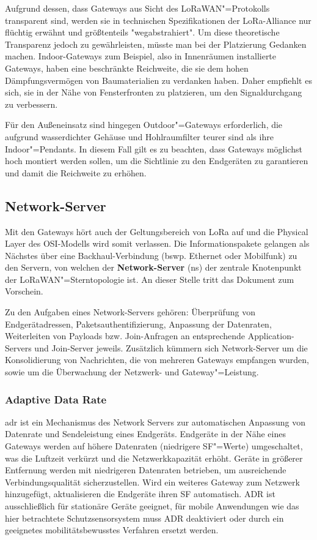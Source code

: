 Aufgrund dessen, dass Gateways aus Sicht des LoRaWAN"=Protokolls transparent sind, werden sie in technischen Spezifikationen der 
LoRa-Alliance nur flüchtig erwähnt und größtenteils "wegabstrahiert". Um diese theoretische Transparenz jedoch zu gewährleisten, 
müsste man bei der Platzierung Gedanken machen. Indoor-Gateways zum Beispiel, also in Innenräumen installierte Gateways, 
haben eine beschränkte Reichweite, die sie dem hohen Dämpfungsvermögen von Baumaterialien zu verdanken haben. 
Daher empfiehlt es sich, sie in der Nähe von Fensterfronten zu platzieren, um den Signaldurchgang zu verbessern. 

Für den Außeneinsatz sind hingegen Outdoor"=Gateways erforderlich, die aufgrund wasserdichter Gehäuse und Hohlraumfilter 
teurer sind als ihre Indoor"=Pendants. In diesem Fall gilt es zu beachten, dass Gateways möglichst hoch montiert werden sollen, 
um die Sichtlinie zu den Endgeräten zu garantieren und damit die Reichweite zu erhöhen.

\subsection{Network-Server}

Mit den Gateways hört auch der Geltungsbereich von LoRa auf und die Physical Layer des OSI-Modells wird somit verlassen. 
Die Informationspakete gelangen als Nächstes über eine Backhaul-Verbindung (bswp. Ethernet oder Mobilfunk) zu den Servern, 
von welchen der \textbf{Network-Server} (\acrshort{ns}) der zentrale Knotenpunkt der LoRaWAN"=Sterntopologie ist. 
An dieser Stelle tritt das Dokument  zum Vorschein. 

Zu den Aufgaben eines Network-Servers gehören: Überprüfung von Endgerätadressen, Paketsauthentifizierung, Anpassung der Datenraten, Weiterleiten von Payloads bzw. Join-Anfragen an entsprechende 
Application-Servers und Join-Server jeweils. Zusätzlich kümmern sich Network-Server um die Konsolidierung von Nachrichten, 
die von mehreren Gateways empfangen wurden, sowie um die Überwachung der Netzwerk- und Gateway"=Leistung. 

\subsubsection*{Adaptive Data Rate}
\label{subsec:adr}

\acrfull{adr} ist ein Mechanismus des Network Servers zur automatischen Anpassung von
Datenrate und Sendeleistung eines Endgeräts. Endgeräte in der Nähe eines Gateways
werden auf höhere Datenraten (niedrigere SF"=Werte) umgeschaltet, was die Luftzeit
verkürzt und die Netzwerkkapazität erhöht. Geräte in größerer Entfernung werden mit
niedrigeren Datenraten betrieben, um ausreichende Verbindungsqualität sicherzustellen.
Wird ein weiteres Gateway zum Netzwerk hinzugefügt, aktualisieren die Endgeräte ihren
SF automatisch. ADR ist ausschließlich für stationäre
Geräte geeignet, für mobile Anwendungen wie das hier betrachtete Schutzsensorsystem 
muss ADR deaktiviert oder durch ein geeignetes mobilitätsbewusstes Verfahren ersetzt
werden. %

